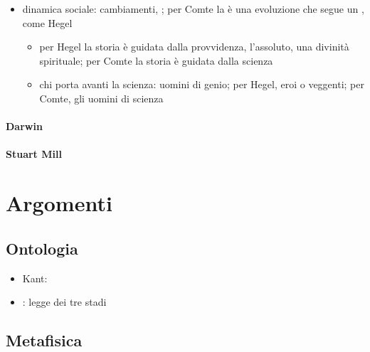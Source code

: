 \documentclass[letterpaper,10pt,italian]{jupyterBook}
\begin{document}
\begin{itemize}
\begin{itemize}
\item {} 
\sphinxAtStartPar
dinamica sociale: cambiamenti, ; per Comte la  è una evoluzione che segue un , come Hegel
\begin{itemize}
\item {} 
\sphinxAtStartPar
per Hegel la storia è guidata dalla provvidenza, l’assoluto, una divinità spirituale; per Comte la storia è guidata dalla scienza

\item {} 
\sphinxAtStartPar
chi porta avanti la scienza: uomini di genio; per Hegel, eroi o veggenti; per Comte, gli uomini di scienza

\end{itemize}

\end{itemize}

\end{itemize}
\subsubsection*{Darwin}
\subsubsection*{Stuart Mill}

\sphinxstepscope


\chapter{Argomenti}
\label{\detokenize{ch/topics:argomenti}}\label{\detokenize{ch/topics:philosophy-topics}}\label{\detokenize{ch/topics::doc}}

\section{Ontologia}
\label{\detokenize{ch/topics:ontologia}}\begin{itemize}
\item {} 
\sphinxAtStartPar
Kant:

\item {} 
\sphinxAtStartPar
{\hyperref[\detokenize{ch/history:pc-comte}]{}}: legge dei tre stadi

\end{itemize}


\section{Metafisica}
\label{\detokenize{ch/topics:metafisica}}
\end{document}
